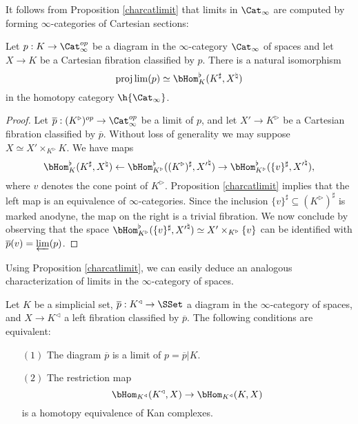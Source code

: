 It follows from Proposition \ref{charcatlimit} that limits in $\Cat_{\infty}$ are computed by forming $\infty$-categories of Cartesian sections:

\begin{corollary}\label{blurt}
Let $p: K \rightarrow \Cat^{op}_{\infty}$ be a diagram in the $\infty$-category $\Cat_{\infty}$ of spaces and let
$X \rightarrow K$ be a Cartesian fibration classified by $p$. There
is a natural isomorphism 
$$ \projlim(p) \simeq \bHom^{\flat}_{K}( K^{\sharp}, X^{\natural} ) $$
in the homotopy category $\h{\Cat_{\infty}}$.
\end{corollary}

\begin{proof}
Let $\overline{p}: (K^{\triangleright})^{op} \rightarrow \Cat_{\infty}^{op}$ be a limit of $p$, and let
$X' \rightarrow K^{\triangleright}$ be a Cartesian fibration classified by
$\overline{p}$. Without loss of generality we may suppose $X \simeq X' \times_{K^{\triangleright}} K$. We have maps
$$ \bHom^{\flat}_{K}( K^{\sharp}, X^{\natural}) \leftarrow \bHom^{\flat}_{K^{\triangleright}}( (K^{\triangleright})^{\sharp}, {X'}^{\natural})
\rightarrow \bHom^{\flat}_{K^{\triangleright} } ( \{v\}^{\sharp}, {X'}^{\natural}),$$
where $v$ denotes the cone point of $K^{\triangleright}$. Proposition \ref{charcatlimit} implies
that the left map is an equivalence of $\infty$-categories. Since the inclusion
$\{v\}^{\sharp} \subseteq (K^{\triangleright})^{\sharp}$ is marked anodyne, the map on the right is a trivial fibration. We now conclude by observing that the space
$ \bHom^{\flat}_{K^{\triangleright} }( \{v\}^{\sharp}, {X'}^{\natural}) \simeq
X' \times_{ K^{\triangleright} } \{v\}$ can be identified with $\overline{p}(v) = \varprojlim(p)$.
\end{proof}

Using Proposition \ref{charcatlimit}, we can easily deduce an analogous characterization of
limits in the $\infty$-category of spaces.

\begin{corollary}\label{charspacelimit}
Let $K$ be a simplicial set, $\overline{p}: K^{\triangleleft} \rightarrow \SSet$ a diagram
in the $\infty$-category of spaces, and $X \rightarrow K^{\triangleleft}$ a left fibration classified by $\overline{p}$. The following conditions are equivalent:
\begin{itemize}
\item[$(1)$] The diagram $\overline{p}$ is a limit of $p = \overline{p} | K$.

\item[$(2)$] The restriction map 
$$ \bHom_{K^{\triangleleft}}( K^{\triangleleft}, X) \rightarrow
\bHom_{K^{\triangleleft}}(K, X)$$
is a homotopy equivalence of Kan complexes.
\end{itemize}
\end{corollary}

